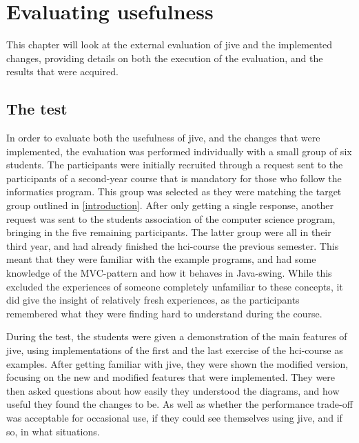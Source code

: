 \chapter{Evaluating usefulness}\label{jiveEval}

This chapter will look at the external evaluation of \gls{jive} and the implemented changes, providing details on both the execution of the evaluation, and the results that were acquired.

\section{The test}\label{jiveEvalTest}
In order to evaluate both the usefulness of \gls{jive}, and the changes that were implemented, the evaluation was performed individually with a small group of six students.
The participants were initially recruited through a request sent to the participants of a second-year course that is mandatory for those who follow the informatics program.
This group was selected as they were matching the target group outlined in \cref{introduction}.
After only getting a single response, another request was sent to the students association of the computer science program, bringing in the five remaining participants.
The latter group were all in their third year, and had already finished the \gls{hci}-course the previous semester.
This meant that they were familiar with the example programs, and had some knowledge of the MVC-pattern and how it behaves in Java-swing.
While this excluded the experiences of someone completely unfamiliar to these concepts, it did give the insight of relatively fresh experiences, as the participants remembered what they were finding hard to understand during the course.

During the test, the students were given a demonstration of the main features of \gls{jive}, using implementations of the first and the last exercise of the \gls{hci}-course as examples.
After getting familiar with \gls{jive}, they were shown the modified version, focusing on the new and modified features that were implemented.
They were then asked questions about how easily they understood the diagrams, and how useful they found the changes to be.
As well as whether the performance trade-off was acceptable for occasional use, if they could see themselves using \gls{jive}, and if so, in what situations.

